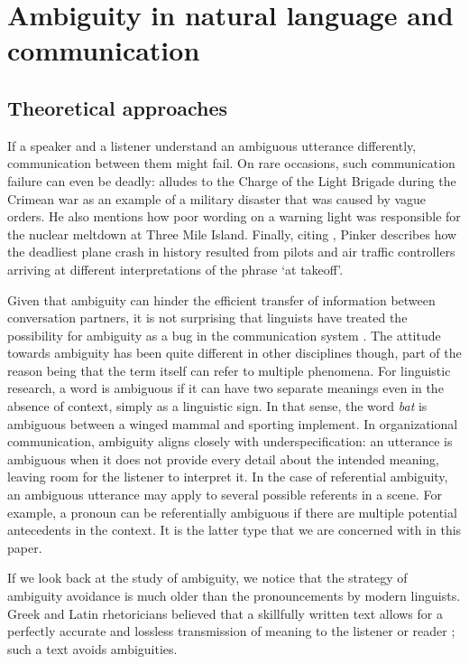 \documentclass[10pt,a4paper]{article}
\begin{document}
\section{Ambiguity in natural language and communication}
\subsection{Theoretical approaches}

If a speaker and a listener understand an ambiguous utterance differently, communication between them might fail.
On rare occasions, such communication failure can even be deadly: 
 alludes to the Charge of the Light Brigade during the Crimean war as an example of a military disaster that was caused by vague orders.
He also mentions how poor wording on a warning light was responsible for the nuclear meltdown at Three Mile Island. Finally, citing , Pinker describes how the deadliest plane crash in history resulted from pilots and air traffic controllers arriving at different interpretations of the phrase `at takeoff'.

Given that ambiguity can hinder the efficient transfer of information between conversation partners, it is not surprising that linguists have treated the possibility for ambiguity as a bug in the communication system \cite{grice1975,chomsky2002minimalism}. The attitude towards ambiguity has been quite different in other disciplines though, part of the reason being that the term itself can refer to multiple phenomena. For linguistic research, a word is ambiguous if it can have two separate meanings even in the absence of context, simply as a linguistic sign. In that sense, the word \textit{bat} is ambiguous between a winged mammal and sporting implement. In organizational communication, ambiguity aligns closely with underspecification: an utterance is ambiguous when it does not provide every detail about the intended meaning, leaving room for the listener to interpret it. In the case of referential ambiguity, an ambiguous utterance may apply to several possible referents in a scene. For example, a pronoun can be referentially ambiguous if there are multiple potential antecedents in the context. It is the latter type that we are concerned with in this paper.

If we look back at the study of ambiguity, we notice that the strategy of ambiguity avoidance is much older than the pronouncements by modern linguists. Greek and Latin rhetoricians believed that a skillfully written text allows for a perfectly accurate and lossless transmission of meaning to the listener or reader \cite{ossarichardson2019}; such a text avoids ambiguities.
\end{document}

